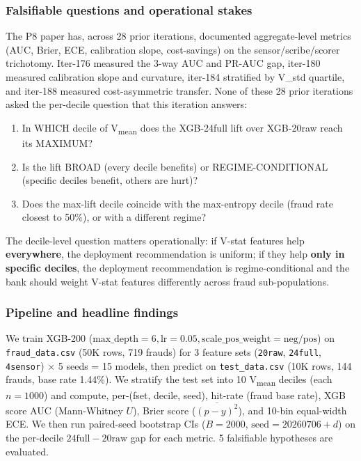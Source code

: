 
\subsubsection{Falsifiable questions and operational stakes}\label{sec:p8-iter192-decile}
The P8 paper has, across 28 prior iterations, documented aggregate-level
metrics (AUC, Brier, ECE, calibration slope, cost-savings) on the
sensor/scribe/scorer trichotomy. Iter-176 measured the 3-way AUC and PR-AUC
gap, iter-180 measured calibration slope and curvature, iter-184 stratified
by V_std quartile, and iter-188 measured cost-asymmetric transfer. None of
these 28 prior iterations asked the per-decile question that this iteration
answers:

\begin{enumerate}
\item In WHICH decile of V\textsubscript{mean} does the
  XGB-24full lift over XGB-20raw reach its MAXIMUM?
\item Is the lift BROAD (every decile benefits) or REGIME-CONDITIONAL
  (specific deciles benefit, others are hurt)?
\item Does the max-lift decile coincide with the max-entropy decile
  (fraud rate closest to 50\%), or with a different regime?
\end{enumerate}

The decile-level question matters operationally: if V-stat features help
\textbf{everywhere}, the deployment recommendation is uniform; if they help
\textbf{only in specific deciles}, the deployment recommendation is
regime-conditional and the bank should weight V-stat features differently
across fraud sub-populations.

\subsubsection{Pipeline and headline findings}\label{sec:p8-iter192-pipeline}
We train XGB-200 ($\mathrm{max\_depth}{=}6, \mathrm{lr}{=}0.05,
\mathrm{scale\_pos\_weight}{=}\mathrm{neg}/\mathrm{pos}$) on
\texttt{fraud\_data.csv} (50K rows, 719 frauds) for 3 feature sets
(\texttt{20raw}, \texttt{24full}, \texttt{4sensor}) $\times$ 5 seeds = 15
models, then predict on \texttt{test\_data.csv} (10K rows, 144 frauds,
base rate 1.44\%). We stratify the test set into 10 V\textsubscript{mean}
deciles (each $n{=}1000$) and compute, per-(fset, decile, seed),
hit-rate (fraud base rate), XGB score AUC (Mann-Whitney $U$), Brier score
($\overline{(p-y)^2}$), and 10-bin equal-width ECE. We then run
paired-seed bootstrap CIs ($B{=}2000$, $\mathrm{seed}{=}20260706{+}d$)
on the per-decile $24\mathrm{full}{-}20\mathrm{raw}$ gap for each metric.
5 falsifiable hypotheses are evaluated.

